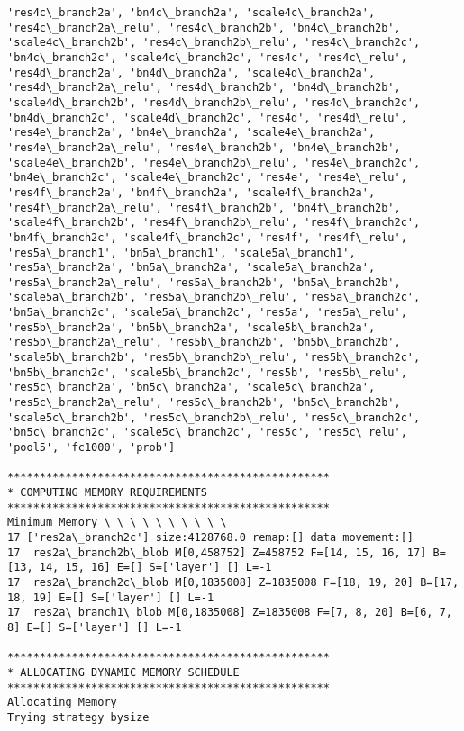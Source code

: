 \documentclass[11pt]{article}
\begin{document}
\begin{Verbatim}[commandchars=\\\{\}]
'res4c\_branch2a', 'bn4c\_branch2a', 'scale4c\_branch2a', 'res4c\_branch2a\_relu', 'res4c\_branch2b', 'bn4c\_branch2b', 'scale4c\_branch2b', 'res4c\_branch2b\_relu', 'res4c\_branch2c', 'bn4c\_branch2c', 'scale4c\_branch2c', 'res4c', 'res4c\_relu', 'res4d\_branch2a', 'bn4d\_branch2a', 'scale4d\_branch2a', 'res4d\_branch2a\_relu', 'res4d\_branch2b', 'bn4d\_branch2b', 'scale4d\_branch2b', 'res4d\_branch2b\_relu', 'res4d\_branch2c', 'bn4d\_branch2c', 'scale4d\_branch2c', 'res4d', 'res4d\_relu', 'res4e\_branch2a', 'bn4e\_branch2a', 'scale4e\_branch2a', 'res4e\_branch2a\_relu', 'res4e\_branch2b', 'bn4e\_branch2b', 'scale4e\_branch2b', 'res4e\_branch2b\_relu', 'res4e\_branch2c', 'bn4e\_branch2c', 'scale4e\_branch2c', 'res4e', 'res4e\_relu', 'res4f\_branch2a', 'bn4f\_branch2a', 'scale4f\_branch2a', 'res4f\_branch2a\_relu', 'res4f\_branch2b', 'bn4f\_branch2b', 'scale4f\_branch2b', 'res4f\_branch2b\_relu', 'res4f\_branch2c', 'bn4f\_branch2c', 'scale4f\_branch2c', 'res4f', 'res4f\_relu', 'res5a\_branch1', 'bn5a\_branch1', 'scale5a\_branch1', 'res5a\_branch2a', 'bn5a\_branch2a', 'scale5a\_branch2a', 'res5a\_branch2a\_relu', 'res5a\_branch2b', 'bn5a\_branch2b', 'scale5a\_branch2b', 'res5a\_branch2b\_relu', 'res5a\_branch2c', 'bn5a\_branch2c', 'scale5a\_branch2c', 'res5a', 'res5a\_relu', 'res5b\_branch2a', 'bn5b\_branch2a', 'scale5b\_branch2a', 'res5b\_branch2a\_relu', 'res5b\_branch2b', 'bn5b\_branch2b', 'scale5b\_branch2b', 'res5b\_branch2b\_relu', 'res5b\_branch2c', 'bn5b\_branch2c', 'scale5b\_branch2c', 'res5b', 'res5b\_relu', 'res5c\_branch2a', 'bn5c\_branch2a', 'scale5c\_branch2a', 'res5c\_branch2a\_relu', 'res5c\_branch2b', 'bn5c\_branch2b', 'scale5c\_branch2b', 'res5c\_branch2b\_relu', 'res5c\_branch2c', 'bn5c\_branch2c', 'scale5c\_branch2c', 'res5c', 'res5c\_relu', 'pool5', 'fc1000', 'prob']

**************************************************
* COMPUTING MEMORY REQUIREMENTS
**************************************************
Minimum Memory \_\_\_\_\_\_\_\_\_\_
17 ['res2a\_branch2c'] size:4128768.0 remap:[] data movement:[]
17	res2a\_branch2b\_blob M[0,458752] Z=458752 F=[14, 15, 16, 17] B=[13, 14, 15, 16] E=[] S=['layer'] [] L=-1
17	res2a\_branch2c\_blob M[0,1835008] Z=1835008 F=[18, 19, 20] B=[17, 18, 19] E=[] S=['layer'] [] L=-1
17	res2a\_branch1\_blob M[0,1835008] Z=1835008 F=[7, 8, 20] B=[6, 7, 8] E=[] S=['layer'] [] L=-1

**************************************************
* ALLOCATING DYNAMIC MEMORY SCHEDULE
**************************************************
Allocating Memory
Trying strategy bysize


\end{Verbatim}
\end{document}
